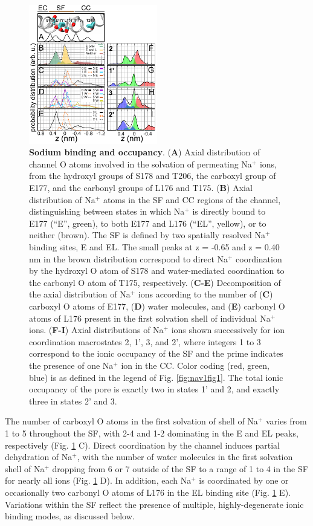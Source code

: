 \begin{refsection}
\begin{figure}[!htb]
\centering
\includegraphics[width=0.5\textwidth]{nav1/Nav1Fig2}
\caption[Sodium binding and occupancy]{\textbf{Sodium binding and occupancy}. (\textbf{A}) Axial distribution of channel O atoms involved in the solvation of permeating Na$^+$ ions, from the hydroxyl groups of S178 and T206, the carboxyl group of E177, and the carbonyl groups of L176 and T175. (\textbf{B}) Axial distribution of Na$^+$ atoms in the SF and CC regions of the channel, distinguishing between states in which Na$^+$ is directly bound to E177 (``E'', green), to both E177 and L176 (``EL'', yellow), or to neither (brown).  The SF is defined by two spatially resolved Na$^+$ binding sites, E and EL.  The small peaks at z = -0.65 and z = 0.40 nm in the brown distribution correspond to direct Na$^+$ coordination by the hydroxyl O atom of S178 and water-mediated coordination to the carbonyl O atom of T175, respectively. (\textbf{C-E}) Decomposition of the axial distribution of Na$^+$ ions according to the number of (\textbf{C}) carboxyl O atoms of E177, (\textbf{D}) water molecules, and (\textbf{E}) carbonyl O atoms of L176 present in the first solvation shell of individual Na$^+$ ions. (\textbf{F-I}) Axial distributions of Na$^+$ ions shown successively for ion coordination macrostates 2, 1', 3, and 2', where integers 1 to 3 correspond to the ionic occupancy of the SF and the prime indicates the presence of one Na$^+$ ion in the CC.  Color coding (red, green, blue) is as defined in the legend of Fig. \ref{fig:nav1fig1}.  The total ionic occupancy of the pore is exactly two in states 1' and 2, and exactly three in states 2' and 3.}
\label{fig:nav1fig2}
\end{figure}

The number of carboxyl O atoms in the first solvation of shell of Na$^+$ varies from 1 to 5 throughout the SF, with 2-4 and 1-2 dominating in the E and EL peaks, respectively (Fig. \ref{fig:nav1fig2} C).  Direct coordination by the channel induces partial dehydration of Na$^+$, with the number of water molecules in the first solvation shell of Na$^+$ dropping from 6 or 7 outside of the SF to a range of 1 to 4 in the SF for nearly all ions (Fig. \ref{fig:nav1fig2} D).  In addition, each Na$^+$ is coordinated by one or occasionally two carbonyl O atoms of L176 in the EL binding site (Fig. \ref{fig:nav1fig2} E).  Variations within the SF reflect the presence of multiple, highly-degenerate ionic binding modes, as discussed below.


\end{refsection}
